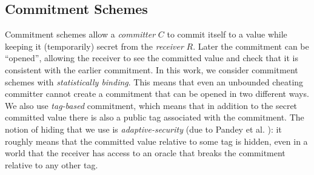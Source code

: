 
\subsection{Commitment Schemes}\label{sec:com}

Commitment schemes allow a {\em committer} $C$ to commit itself to a value while keeping it (temporarily) secret from the {\em receiver} $R$. Later the commitment can be ``opened'', allowing the receiver to see the committed value and check that it is consistent with the earlier commitment.
In this work, we consider commitment schemes with \emph{statistically binding}. This means that even an unbounded cheating committer cannot create a commitment that can be opened in two different ways. We also use \emph{tag-based} commitment, which means that in addition to the secret committed value there is also a public tag associated with the commitment. The notion of hiding that we use is \emph{adaptive-security} (due to Pandey et al. \cite{C:PanPasVai08}): it roughly means that the committed value relative to some tag is hidden, even in a world that the receiver has access to an oracle that breaks the commitment relative to any other tag.

